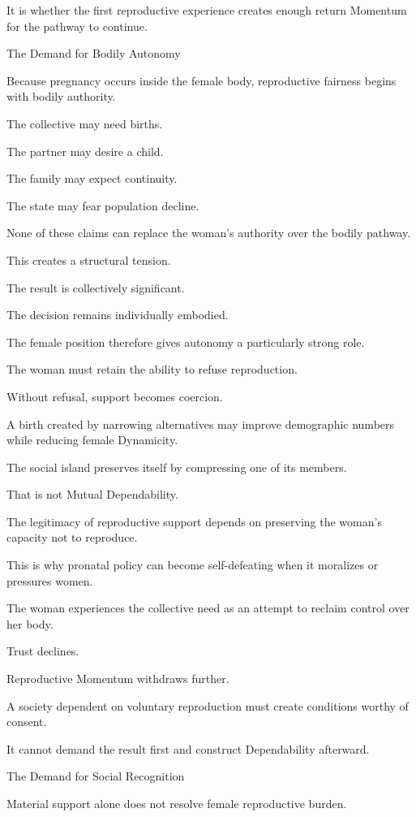 It is whether the first reproductive experience creates enough return Momentum for the pathway to continue.

The Demand for Bodily Autonomy

Because pregnancy occurs inside the female body, reproductive fairness begins with bodily authority.

The collective may need births.

The partner may desire a child.

The family may expect continuity.

The state may fear population decline.

None of these claims can replace the woman’s authority over the bodily pathway.

This creates a structural tension.

The result is collectively significant.

The decision remains individually embodied.

The female position therefore gives autonomy a particularly strong role.

The woman must retain the ability to refuse reproduction.

Without refusal, support becomes coercion.

A birth created by narrowing alternatives may improve demographic numbers while reducing female Dynamicity.

The social island preserves itself by compressing one of its members.

That is not Mutual Dependability.

The legitimacy of reproductive support depends on preserving the woman’s capacity not to reproduce.

This is why pronatal policy can become self-defeating when it moralizes or pressures women.

The woman experiences the collective need as an attempt to reclaim control over her body.

Trust declines.

Reproductive Momentum withdraws further.

A society dependent on voluntary reproduction must create conditions worthy of consent.

It cannot demand the result first and construct Dependability afterward.

The Demand for Social Recognition

Material support alone does not resolve female reproductive burden.

